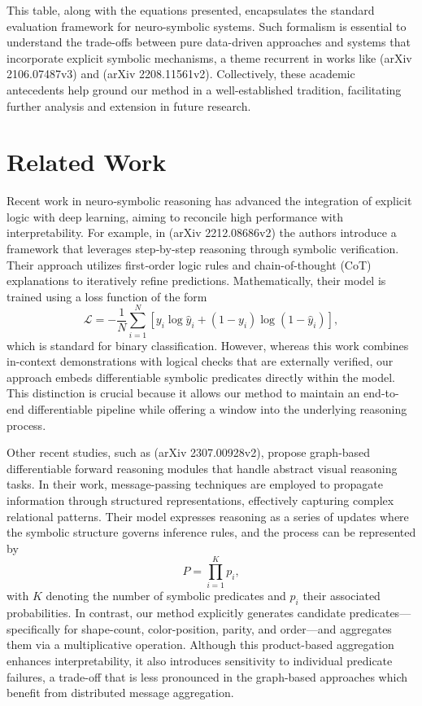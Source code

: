 \documentclass[11pt]{article}
\begin{document}
This table, along with the equations presented, encapsulates the standard evaluation framework for neuro-symbolic systems. Such formalism is essential to understand the trade-offs between pure data-driven approaches and systems that incorporate explicit symbolic mechanisms, a theme recurrent in works like (arXiv 2106.07487v3) and (arXiv 2208.11561v2). Collectively, these academic antecedents help ground our method in a well-established tradition, facilitating further analysis and extension in future research.

\section{Related Work}
Recent work in neuro‐symbolic reasoning has advanced the integration of explicit logic with deep learning, aiming to reconcile high performance with interpretability. For example, in (arXiv 2212.08686v2) the authors introduce a framework that leverages step‐by‐step reasoning through symbolic verification. Their approach utilizes first‐order logic rules and chain-of-thought (CoT) explanations to iteratively refine predictions. Mathematically, their model is trained using a loss function of the form
\[
\mathcal{L} = -\frac{1}{N}\sum_{i=1}^{N} \left[y_i\log\hat{y}_i + (1-y_i)\log(1-\hat{y}_i)\right],
\]
which is standard for binary classification. However, whereas this work combines in-context demonstrations with logical checks that are externally verified, our approach embeds differentiable symbolic predicates directly within the model. This distinction is crucial because it allows our method to maintain an end-to-end differentiable pipeline while offering a window into the underlying reasoning process.

Other recent studies, such as (arXiv 2307.00928v2), propose graph-based differentiable forward reasoning modules that handle abstract visual reasoning tasks. In their work, message-passing techniques are employed to propagate information through structured representations, effectively capturing complex relational patterns. Their model expresses reasoning as a series of updates where the symbolic structure governs inference rules, and the process can be represented by
\[
P = \prod_{i=1}^{K} p_i,
\]
with \( K \) denoting the number of symbolic predicates and \( p_i \) their associated probabilities. In contrast, our method explicitly generates candidate predicates—specifically for shape-count, color-position, parity, and order—and aggregates them via a multiplicative operation. Although this product-based aggregation enhances interpretability, it also introduces sensitivity to individual predicate failures, a trade-off that is less pronounced in the graph-based approaches which benefit from distributed message aggregation.
\end{document}
